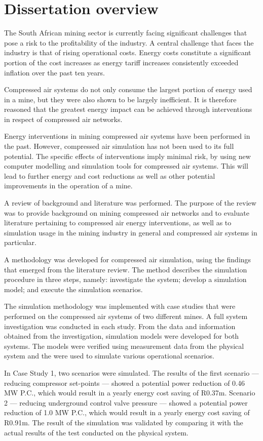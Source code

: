 	 \section{Dissertation overview}
		The South African mining sector is currently facing significant challenges that pose a risk to the profitability of the industry. A central challenge that faces the industry is that of rising operational costs. Energy costs constitute a significant portion of the cost increases as energy tariff increases consistently exceeded inflation over the past ten years.
	 \par
		Compressed air systems do not only consume the largest portion of energy used in a mine, but they were also shown to be largely inefficient. It is therefore reasoned that the greatest energy impact can be achieved through interventions in respect of compressed air networks.
	 \par 
		Energy interventions in mining compressed air systems have been performed in the past. However, compressed air simulation has not been used to its full potential. The specific effects of interventions imply minimal risk, by using new computer modelling and simulation tools for compressed air systems. This will lead to further energy and cost reductions as well as other potential improvements in the operation of a mine.
	 \par 
	 A review of background and literature was performed. The purpose of the review was to provide background on mining compressed air networks and to evaluate literature pertaining to compressed air energy interventions, as well as to simulation usage in the mining industry in general and compressed air systems in particular.
	 \par 
		A methodology was developed for compressed air simulation, using the findings that emerged from the literature review. The method describes the simulation procedure in three steps, namely: investigate the system; develop a simulation model; and execute the simulation scenarios.
	 \par 
The simulation methodology was implemented with case studies that were performed on the compressed air systems of two different mines. A full system investigation was conducted in each study. From the data and information obtained from the investigation, simulation models were developed for both systems. The models were verified using measurement data from the physical system and the were used to simulate various operational scenarios.
	 \par 
In Case Study 1, two scenarios were simulated. The results of the first scenario --- reducing compressor  set-points --- showed a potential power reduction of 0.46 MW P.C., which would result in a yearly energy cost saving of R0.37m. Scenario 2 --- reducing underground control valve pressure --- showed a potential power reduction of 1.0 MW P.C., which would result in a yearly energy cost saving of R0.91m. The result of the simulation was validated by comparing it with the actual results of the test conducted on the physical system.

